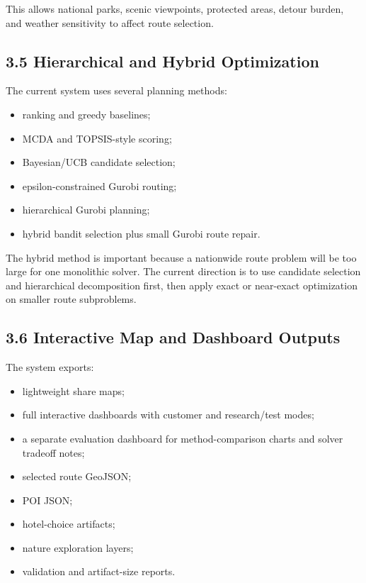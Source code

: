 \documentclass[11pt,a4paper]{article}
\begin{document}
\noindent This allows national parks, scenic viewpoints, protected areas, detour burden, and weather sensitivity to affect route selection.

\subsection*{3.5 Hierarchical and Hybrid Optimization}

\noindent The current system uses several planning methods:

\begin{itemize}
    \item ranking and greedy baselines;
    \item MCDA and TOPSIS-style scoring;
    \item Bayesian/UCB candidate selection;
    \item epsilon-constrained Gurobi routing;
    \item hierarchical Gurobi planning;
    \item hybrid bandit selection plus small Gurobi route repair.
\end{itemize}

\noindent The hybrid method is important because a nationwide route problem will be too large for one monolithic solver. The current direction is to use candidate selection and hierarchical decomposition first, then apply exact or near-exact optimization on smaller route subproblems.

\subsection*{3.6 Interactive Map and Dashboard Outputs}

\noindent The system exports:

\begin{itemize}
    \item lightweight share maps;
    \item full interactive dashboards with customer and research/test modes;
    \item a separate evaluation dashboard for method-comparison charts and solver tradeoff notes;
    \item selected route GeoJSON;
    \item POI JSON;
    \item hotel-choice artifacts;
    \item nature exploration layers;
    \item validation and artifact-size reports.
\end{itemize}
\end{document}
